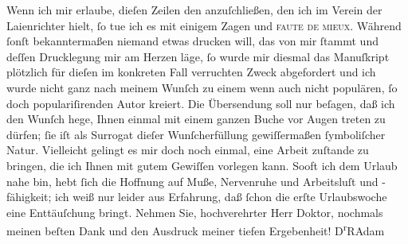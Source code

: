 \begin{ledgroupsized}[t]{13cm}
           Wenn ich mir erlaube, dieſen Zeilen den \label{K_L02514_1v}\label{K_L02514_1h} anzuſchließen, den ich im Verein der Laienrichter hielt, ſo tue ich es mit einigem
                    Zagen und \textsc{faute de mieux}. Während ſonſt bekanntermaßen
                    niemand etwas drucken will, das von mir ſtammt und deſſen Drucklegung mir am
                    Herzen läge, ſo wurde mir diesmal das Manuſkript plötzlich für dieſen im
                    konkreten Fall verruchten Zweck abgefordert und ich wurde nicht ganz nach meinem
                    Wunſch zu einem wenn auch nicht populären, ſo doch populariſirenden Autor
                    kreiert. Die Übersendung soll nur beſagen, daß ich den Wunſch hege, Ihnen einmal
                    mit einem ganzen Buche {\pb}vor Augen
                    treten zu dürfen; ſie iſt als Surrogat dieſer Wunſcherfüllung gewiſſermaßen
                    ſymboliſcher Natur.\pend
           \pstart
           Vielleicht gelingt es mir doch noch einmal, eine Arbeit zuſtande zu bringen, die
                    ich Ihnen mit gutem Gewiſſen vorlegen kann. Sooft ich dem Urlaub nahe bin, hebt
                    ſich die Hoffnung auf Muße, Nervenruhe und Arbeitsluſt und -fähigkeit; ich weiß
                    nur leider aus Erfahrung, daß ſchon die erſte Urlaubswoche eine Enttäuſchung
                    bringt.\pend
           \pstart
           Nehmen Sie, hochverehrter Herr Doktor, nochmals meinen beſten Dank und den
                    Ausdruck meiner tiefen Ergebenheit!\pend
           \pstart \spacefill\mbox{D\textsuperscript{r}RAdam}\pend{}\endnumbering{}\end{ledgroupsized}  \newcommand{\dateiname}{L02514}\newcommand{\titel}{Robert Adam an Arthur Schnitzler, 22. 7. 1929}\newcommand{\editorInnen}{Martin Anton Müller und Gerd-Hermann Susen}
      
